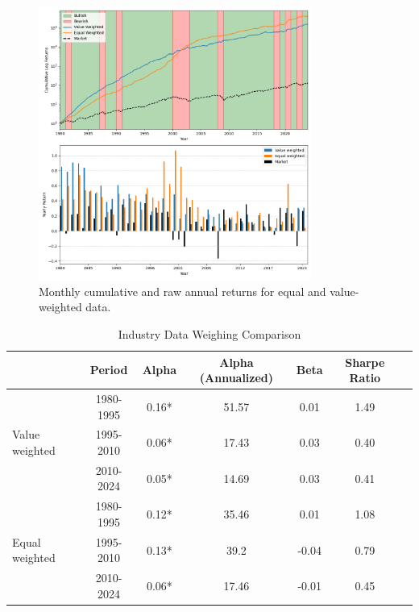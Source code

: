 \documentclass{article}
\begin{document}
\newpage

\begin{figure}[H]
    \centering
    \includegraphics[width=0.8\textwidth]{2024_plot6_portfolio_weighting_comparison.png}
    \caption{Monthly cumulative and raw annual returns for equal and value-weighted data.}
    \label{fig:data_weighing_comp}
\end{figure}


\begin{table}[h]
    \centering
    \begin{tabular}{lcccccc}
        \toprule
        & Period & Alpha & Alpha (Annualized) & Beta & Sharpe Ratio \\
        \midrule
        \multirow{3}{*}{Value weighted} & 1980-1995 & 0.16* & 51.57 & 0.01 & 1.49 \\
                                        & 1995-2010 & 0.06* & 17.43 & 0.03 & 0.40 \\
                                        & 2010-2024 & 0.05* & 14.69 & 0.03 & 0.41 \\
        \midrule
        \multirow{3}{*}{Equal weighted} & 1980-1995 & 0.12* & 35.46 & 0.01 & 1.08 \\
                                        & 1995-2010 & 0.13* & 39.2 & -0.04 & 0.79 \\
                                        & 2010-2024 & 0.06* & 17.46 & -0.01 & 0.45 \\
        \bottomrule
    \end{tabular}
    \caption{Industry Data Weighing Comparison}
    \label{tab:data_weighing_comp}
\end{table}
\end{document}
